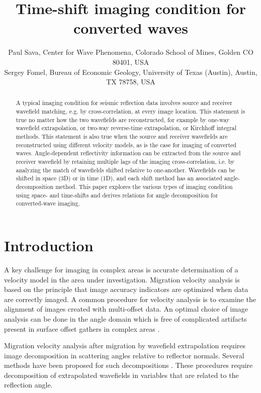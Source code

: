 \title{Time-shift imaging condition for converted waves}
\author{
Paul Sava, Center for Wave Phenomena, Colorado School of Mines, Golden CO 80401, USA \\
Sergey Fomel, Bureau of Economic Geology, University of Texas (Austin), Austin, TX 78758, USA
}

\maketitle



\begin{abstract}
A typical imaging condition for seismic reflection data 
involves source and receiver wavefield matching, e.g. by
cross-correlation, at every image location. 
This statement is true no matter how the two wavefields
are reconstructed, for example by 
one-way wavefield extrapolation, or
two-way reverse-time extrapolation, or
Kirchhoff integral methods.
This statement is also true when the source and receiver
wavefields are reconstructed using different velocity models,
as is the case for imaging of converted waves.
Angle-dependent reflectivity information can be extracted
from the source and receiver wavefield by retaining multiple lags
of the imaging cross-correlation, i.e. by analyzing the match of 
wavefields shifted relative to one-another.
Wavefields can be shifted in space (3D) or in time (1D), and
each shift method has an associated angle-decomposition method.
This paper explores the various types of imaging condition 
using space- and time-shifts and
derives relations for angle decomposition for converted-wave
imaging.
\end{abstract}

\section{Introduction}
A key challenge for imaging in complex areas is accurate
determination of a velocity model in the area under investigation.
Migration velocity analysis is based on the principle that
image accuracy indicators are optimized when
data are correctly imaged.
A common procedure for velocity analysis is to examine the
alignment of images created with multi-offset data.
An optimal choice of image analysis can be done in the
angle domain which is free of complicated
artifacts present in surface offset gathers in complex areas
\cite[]{GEO69-02-05620575}.
\par
Migration velocity analysis after migration by wavefield
extrapolation requires image decomposition
in scattering angles relative
to reflector normals. Several methods have
been proposed for such decompositions
\cite[]{GEO55-09-12231234,
SEG-1999-08240827,
SEG-2000-08300833,
GEO67-03-08830889,
XieWu.adcig,
GEO68-03-10651074,
SEG-2003-08890892,
Fomel.seg.3dadcig,
SEG-2003-21042107}.
These procedures require decomposition of
extrapolated wavefields in variables that are
related to the reflection angle.

